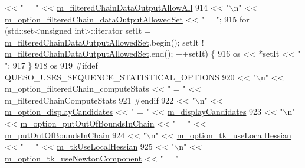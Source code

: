 \begin{DoxyCode}
        << \textcolor{stringliteral}{" = "} << \hyperlink{class_q_u_e_s_o_1_1_m_l_sampling_level_options_a80471ba2c70d39f2cb7e1ea954fb86b8}{m\_filteredChainDataOutputAllowAll}
914      << \textcolor{stringliteral}{"\(\backslash\)n"} << \hyperlink{class_q_u_e_s_o_1_1_m_l_sampling_level_options_a830bffae5d6cc92fd551db4ef6dfee64}{m\_option\_filteredChain\_dataOutputAllowedSet}     
          << \textcolor{stringliteral}{" = "};
915   \textcolor{keywordflow}{for} (std::set<unsigned int>::iterator setIt = 
      \hyperlink{class_q_u_e_s_o_1_1_m_l_sampling_level_options_a12bf1b2424e791608d3dcd1254c3eef2}{m\_filteredChainDataOutputAllowedSet}.begin(); setIt != 
      \hyperlink{class_q_u_e_s_o_1_1_m_l_sampling_level_options_a12bf1b2424e791608d3dcd1254c3eef2}{m\_filteredChainDataOutputAllowedSet}.end(); ++setIt) \{
916     os << *setIt << \textcolor{stringliteral}{" "};
917   \}
918   os
919 \textcolor{preprocessor}{#ifdef QUESO\_USES\_SEQUENCE\_STATISTICAL\_OPTIONS}
920 \textcolor{preprocessor}{}     << \textcolor{stringliteral}{"\(\backslash\)n"} << m\_option\_filteredChain\_computeStats                 << \textcolor{stringliteral}{" = "} << m\_filteredChainComputeStats
921 \textcolor{preprocessor}{#endif}
922 \textcolor{preprocessor}{}     << \textcolor{stringliteral}{"\(\backslash\)n"} << \hyperlink{class_q_u_e_s_o_1_1_m_l_sampling_level_options_a54c504f38cb33871eb90b38b4ba80e89}{m\_option\_displayCandidates}                          << \textcolor{stringliteral}{" = "} << 
      \hyperlink{class_q_u_e_s_o_1_1_m_l_sampling_level_options_a975a24a45096ac07b8e3a6cade590bbc}{m\_displayCandidates}
923      << \textcolor{stringliteral}{"\(\backslash\)n"} << \hyperlink{class_q_u_e_s_o_1_1_m_l_sampling_level_options_a1858cab9660831ae92eb12aad280aa67}{m\_option\_putOutOfBoundsInChain}                      << \textcolor{stringliteral}{" = "} 
      << \hyperlink{class_q_u_e_s_o_1_1_m_l_sampling_level_options_acf244c6ea5d1ac9c61d19d1d8f24fd8c}{m\_putOutOfBoundsInChain}
924      << \textcolor{stringliteral}{"\(\backslash\)n"} << \hyperlink{class_q_u_e_s_o_1_1_m_l_sampling_level_options_a341b15acf7986499350294276d25954a}{m\_option\_tk\_useLocalHessian}                         << \textcolor{stringliteral}{" = "} << 
      \hyperlink{class_q_u_e_s_o_1_1_m_l_sampling_level_options_a981084edf651ff9db5dd56a36ef54a61}{m\_tkUseLocalHessian}
925      << \textcolor{stringliteral}{"\(\backslash\)n"} << \hyperlink{class_q_u_e_s_o_1_1_m_l_sampling_level_options_a875164924a6fe4ccf52d66db10c272a8}{m\_option\_tk\_useNewtonComponent}                      << \textcolor{stringliteral}{" = "} 

\end{DoxyCode}
